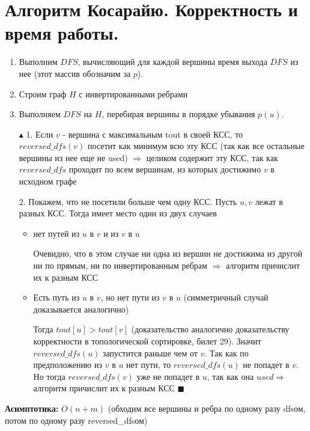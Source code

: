 \section{Алгоритм Косарайю. Корректность и время работы.}
\begin{enumerate}
    \item Выполним $DFS$, вычисляющий для каждой вершины время выхода $DFS$ из нее (этот массив обозначим за $p$).
    \item Строим граф $H$ с инвертированными ребрами
    
    \item Выполняем $DFS$ на $H$, перебирая вершины в порядке убывания $p(u)$.
\end{enumerate}

\begin{figure}[h]
\end{figure}
\par \begin{itemize}
    \item[$\blacktriangle$ 1.] Если $v$ - вершина с максимальным tout в своей КСС, то $reversed\_dfs(v)$ посетит как минимум всю эту КСС (так как все остальные вершины из нее еще не used) $\Rightarrow$ целиком содержит эту КСС, так как $reversed\_dfs$ проходит по всем вершинам, из которых достижимо $v$ в исходном графе
    \item[2.] Покажем, что не посетили больше чем одну КСС. Пусть $u,v$ лежат в разных КСС. Тогда имеет место один из двух случаев
    \begin{itemize}
        \item нет путей из $u$ в $v$ и из $v$ в $u$
        \par Очевидно, что в этом случае ни одна из вершин не достижима из другой ни по прямым, ни по инвертированным ребрам $\Rightarrow$ алгоритм причислит их к разным КСС
        \item Есть путь из $u$ в $v$, но нет пути из $v$ в $u$ (симметричный случай доказывается аналогично)
        \par Тогда $tout[u]>tout[v]$ (доказательство аналогично доказательству корректности в топологической сортировке, билет 29). Значит $reversed\_dfs(u)$ запустится раньше чем от $v$. Так как по предположению из $v$ в $u$ нет пути, то $reversed\_dfs(u)$ не попадет в $v$. Но тогда $reversed\_dfs(v)$ уже не попадет в $u$, так как она $used \Rightarrow$ алгоритм причислит их к разным КСС $\blacksquare$
    \end{itemize}
\end{itemize}
\par \textbf{Асимптотика:} $O(n+m)$ (обходим все вершины и ребра по одному разу dfsом, потом по одному разу reversed\_dfsом)
